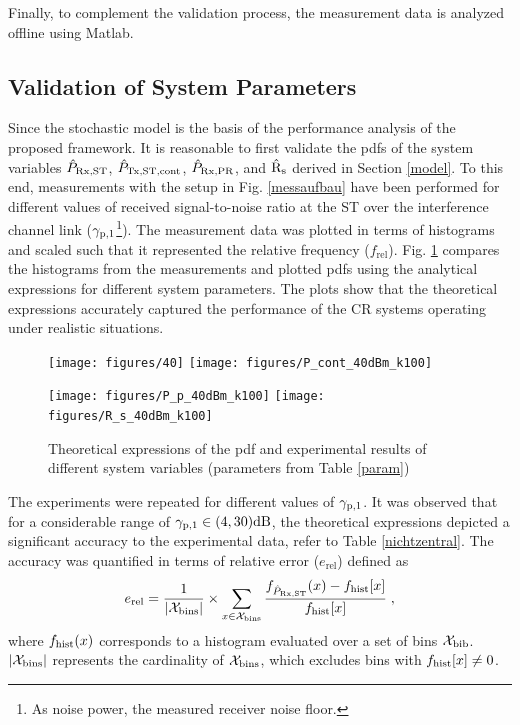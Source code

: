 Finally, to complement the validation process, the measurement data is analyzed offline using Matlab.

\subsection{Validation of System Parameters}

Since the stochastic model is the basis of the performance analysis of the proposed framework. It is reasonable to first validate the pdfs of the system variables $\hat{P}_{\text{Rx,ST}}$, $\hat{P}_{\text{Tx,ST,cont}}$, $\hat{P}_{\text{Rx,PR}}$, and $\hat{\text{{R}}}_{\text{s}}$ derived in Section \ref{model}. To this end, measurements with the setup in Fig. \ref{messaufbau} have been performed for different values of received signal-to-noise ratio at the ST over the interference channel link (${\gamma}_{\text{p,1}}$\footnote{As noise power, the measured receiver noise floor.}). The measurement data was plotted in terms of histograms and scaled such that it represented the relative frequency ($f_\textrm{rel}$). Fig. \ref{hrel_pdf} compares the histograms from the measurements and plotted pdfs using the analytical expressions for different system parameters. The plots show that the theoretical expressions accurately captured the performance of the CR systems operating under realistic situations. 



\begin{figure}
	\centering
	\texttt{[image: figures/40]}%
	\texttt{[image: figures/P\_cont\_40dBm\_k100]}%
	
	\texttt{[image: figures/P\_p\_40dBm\_k100]}%
	\texttt{[image: figures/R\_s\_40dBm\_k100]}%
	\caption{Theoretical expressions of the pdf and experimental results of different system variables (parameters from Table \ref{param})}
	\label{hrel_pdf}
\end{figure}

The experiments were repeated for different values of ${\gamma}_{\text{p,1}}$. It was observed that for a considerable range of ${\gamma}_{\text{p,1}} \in (4,30)\SI{}{dB}$, the theoretical expressions depicted a significant accuracy to the experimental data, refer to Table \ref{nichtzentral}. The accuracy was quantified in terms of relative error ($e_\textrm{rel}$) defined as
\begin{equation}
\label{fr}
e_\textrm{rel} = \frac{1}{|\mathcal X_{\text{bins}}|} \times \sum_{x \in \mathcal X_{\text{bins}}} \frac{f_{\hat{P}_{\text{Rx,ST}}}(x) - f_{\text{hist}}[x]}{f_{\text{hist}}[x]} \;  , 
\end{equation}
where $f_{\text{hist}}(x)$ corresponds to a histogram evaluated over a set of bins $\mathcal X_{\text{bib}}$. $|\mathcal X_{\text{bins}}|$ represents the cardinality of $\mathcal X_{\text{bins}}$, which excludes bins with $f_{\text{hist}}[x] \neq 0$. 

